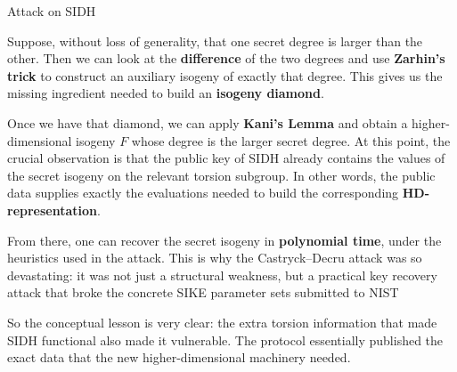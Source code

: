 \documentclass[aspectratio=169,notheorems]{beamer}
\begin{document}
\begin{frame}{Attack on SIDH}
{			Suppose, without loss of generality, that one secret degree is larger than the other. Then we can look at the \textbf{difference} of the two degrees and use \textbf{Zarhin's trick} to construct an auxiliary isogeny of exactly that degree. This gives us the missing ingredient needed to build an \textbf{isogeny diamond}.
			
			Once we have that diamond, we can apply \textbf{Kani's Lemma} and obtain a higher-dimensional isogeny \(F\) whose degree is the larger secret degree. At this point, the crucial observation is that the public key of SIDH already contains the values of the secret isogeny on the relevant torsion subgroup. In other words, the public data supplies exactly the evaluations needed to build the corresponding \textbf{HD-representation}. 
			
			From there, one can recover the secret isogeny in \textbf{polynomial time}, under the heuristics used in the attack. This is why the Castryck--Decru attack was so devastating: it was not just a structural weakness, but a practical key recovery attack that broke the concrete SIKE parameter sets submitted to NIST
			
			So the conceptual lesson is very clear: the extra torsion information that made SIDH functional also made it vulnerable. The protocol essentially published the exact data that the new higher-dimensional machinery needed.
		}
	\end{frame}
	
	
\end{document}
